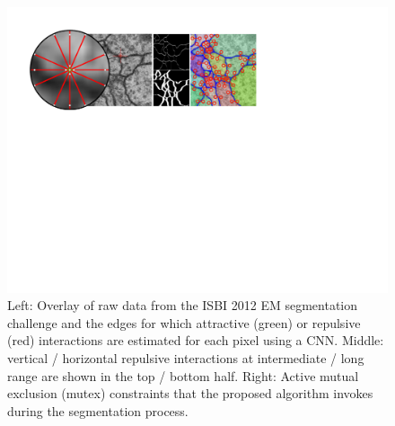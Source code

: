 \begin{figure}[t]
    \centering
    \includegraphics[width=1.\linewidth]{figures/MWS/images/fig1slimt.pdf}%
    \caption[Overview of raw data, CNN predictions, and mutual exclusion constraints]{Left: Overlay of raw data from the ISBI 2012 EM segmentation challenge and the edges for which attractive (green) or repulsive (red) interactions are estimated for each pixel using a CNN. Middle: vertical / horizontal repulsive interactions at intermediate / long range are shown in the top / bottom half. Right: Active mutual exclusion (mutex) constraints that the proposed algorithm invokes during the segmentation process.}
    \label{fig:main}
    \vspace{-0.05cm}
\end{figure}


